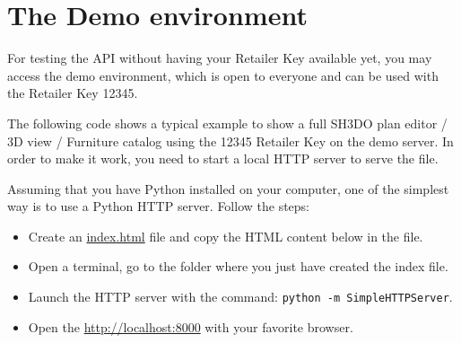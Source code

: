 \documentclass[a4paper]{report}
\begin{document}
\section{The Demo environment}

For testing the API without having your Retailer Key available yet, you may access the demo environment, which is open to everyone and can be used with the Retailer Key 12345.

The following code shows a typical example to show a full SH3DO plan editor / 3D view / Furniture catalog using the 12345 Retailer Key on the demo server. In order to make it work, you need to start a local HTTP server to serve the file. 

Assuming that you have Python installed on your computer, one of the simplest way is to use a Python HTTP server. Follow the steps:

\begin{itemize}
\item Create an \url{index.html} file and copy the HTML content below in the file.
\item Open a terminal, go to the folder where you just have created the index file.
\item Launch the HTTP server with the command: \texttt{python -m SimpleHTTPServer}.
\item Open the \url{http://localhost:8000} with your favorite browser.
\end{itemize}
\end{document}
